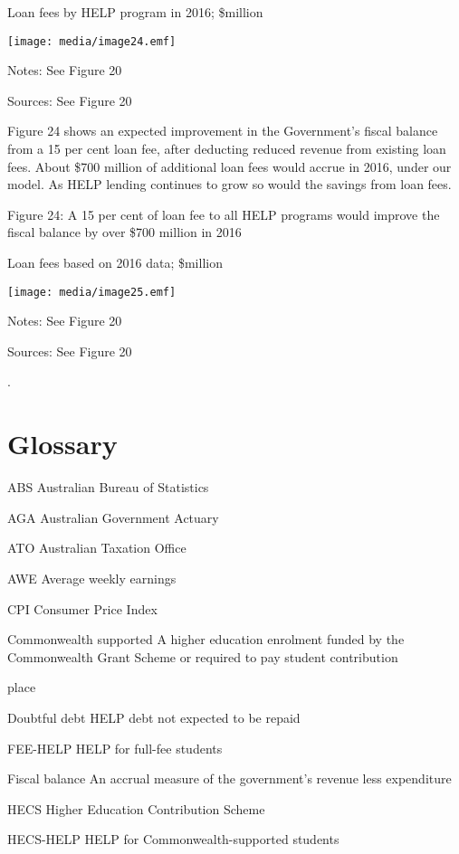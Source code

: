 \documentclass[]{book}
\begin{document}
Loan fees by HELP program in 2016; \$million

\texttt{[image: media/image24.emf]}

Notes: See Figure 20

Sources: See Figure 20

Figure 24 shows an expected improvement in the Government's fiscal balance from a 15 per cent loan fee, after deducting reduced revenue from existing loan fees. About \$700 million of additional loan fees would accrue in 2016, under our model. As HELP lending continues to grow so would the savings from loan fees.

\protect\hypertarget{_Ref325717988}{}{}Figure 24: A 15 per cent of loan fee to all HELP programs would improve the fiscal balance by over \$700 million in 2016

Loan fees based on 2016 data; \$million

\texttt{[image: media/image25.emf]}

Notes: See Figure 20

Sources: See Figure 20

.

\chapter{\texorpdfstring{\protect\hypertarget{_Toc320544430}{}{\protect\hypertarget{_Toc341784486}{}{}}Glossary}{Glossary}}\label{glossary}

ABS Australian Bureau of Statistics

AGA Australian Government Actuary

ATO Australian Taxation Office

AWE Average weekly earnings

CPI Consumer Price Index

Commonwealth supported A higher education enrolment funded by the Commonwealth Grant Scheme or required to pay student contribution

place

Doubtful debt HELP debt not expected to be repaid

FEE-HELP HELP for full-fee students

Fiscal balance An accrual measure of the government's revenue less expenditure

HECS Higher Education Contribution Scheme

HECS-HELP HELP for Commonwealth-supported students
\end{document}
